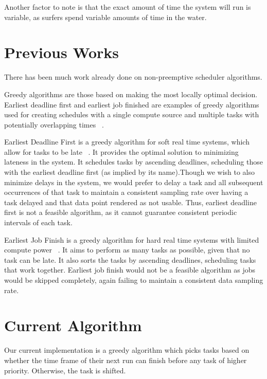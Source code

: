 \documentclass{article}
\begin{document}
Another factor to note is that the exact amount of time the system will run is variable, as surfers spend variable amounts of time in the water.

\section{Previous Works}
There has been much work already done on non-preemptive scheduler algorithms.

Greedy algorithms are those based on making the most locally optimal decision. Earliest deadline first and earliest job finished are examples of greedy algorithms used for creating schedules with a single compute source and multiple tasks with potentially overlapping times ~\cite{Karger97}.

Earliest Deadline First is a greedy algorithm for soft real time systems, which allow for tasks to be late ~\cite{Karger97}. It provides the optimal solution to minimizing lateness in the system. It schedules tasks by ascending deadlines, scheduling those with the earliest deadline first (as implied by its name).Though we wish to also minimize delays in the system, we would prefer to delay a task and all subsequent occurrences of that task to maintain a consistent sampling rate over having a task delayed and that data point rendered as not usable. Thus, earliest deadline first is not a feasible algorithm, as it cannot guarantee consistent periodic intervals of each task. \newline

Earliest Job Finish is a greedy algorithm for hard real time systems with limited compute power ~\cite{Karger97}. It aims to perform as many tasks as possible, given that no task can be late. It also sorts the tasks by ascending deadlines, scheduling tasks that work together. Earliest job finish would not be a feasible algorithm as jobs would be skipped completely, again failing to maintain a consistent data sampling rate.

\section{Current Algorithm}

Our current implementation is a greedy algorithm which picks tasks based on whether the time frame of their next run can finish before any task of higher priority. Otherwise, the task is shifted.
\end{document}
